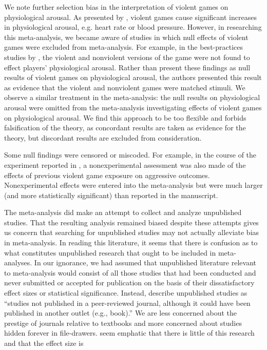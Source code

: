 \documentclass[man]{apa6}
\begin{document}
We note further selection bias in the interpretation of violent games on physiological arousal. As presented by \citet{Anderson:etal:2010}, violent games cause significant increases in physiological arousal, e.g. heart rate or blood pressure. However, in researching this meta-analysis, we became aware of studies in which null effects of violent games were excluded from meta-analysis. For example, in the best-practices studies by \citet{Carnagey:Anderson:2005}, the violent and nonviolent versions of the game were not found to effect players' physiological arousal. Rather than present these findings as null results of violent games on physiological arousal, the authors presented this result as evidence that the violent and nonviolent games were matched stimuli. We observe a similar treatment in the meta-analysis: the null results on physiological arousal were omitted from the meta-analysis investigating effects of violent games on physiological arousal. We find this approach to be too flexible and forbids falsification of the theory, as concordant results are taken as evidence for the theory, but discordant results are excluded from consideration.

Some null findings were censored or miscoded. For example, in the course of the experiment reported in \citet{Carnagey:Anderson:2005}, a nonexperimental assessment was also made of the effects of previous violent game exposure on aggressive outcomes. Nonexperimental effects were entered into the \citet{Anderson:etal:2010} meta-analysis but were much larger (and more statistically significant) than reported in the \citet{Carnagey:Anderson:2005} manuscript.

The \citep{Anderson:etal:2010} meta-analysis did make an attempt to collect and analyze unpublished studies. That the resulting analysis remained biased despite these attempts gives us concern that searching for unpublished studies may not actually alleviate bias in meta-analysis. 
In reading this literature, it seems that there is confusion as to what constitutes unpublished research that ought to be included in meta-analyses. In our ignorance, we had assumed that unpublished literature relevant to meta-analysis would consist of all those studies that had been conducted and never submitted or accepted for publication on the basis of their dissatisfactory effect sizes or statistical significance. Instead, \citet{Bushman:etal:2010} describe unpublished studies as ``studies not published in a peer-reviewed journal, although it could have been published in another outlet (e.g., book).'' We are less concerned about the prestige of journals relative to textbooks and more concerned about studies hidden forever in file-drawers.
\citet{Anderson:etal:2010} seem emphatic that there is little of this research and that the effect size is 
\end{document}
